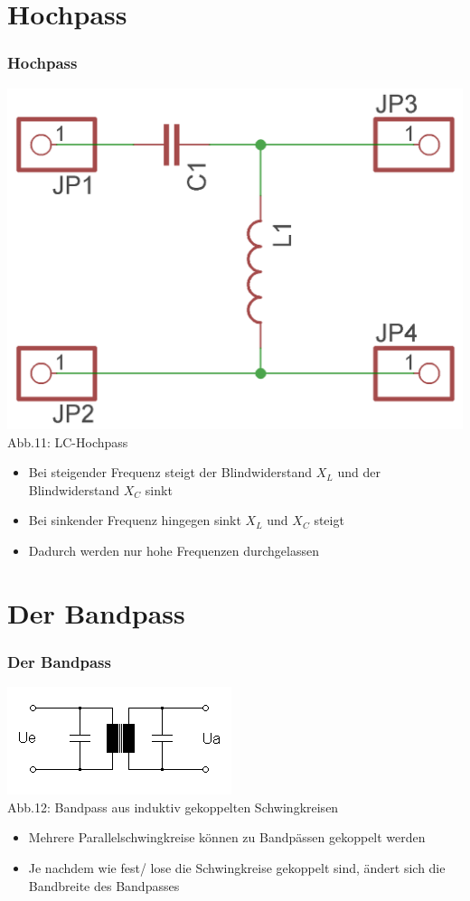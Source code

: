 \section*{Hochpass}
\begin{frame}
\frametitle{Hochpass}
\begin{center}
	\includegraphics[scale=1.2]{a04/LC-Hochpass.png}\\
	Abb.11: LC-Hochpass
\end{center}
\begin{itemize}
	\item Bei steigender Frequenz steigt der Blindwiderstand $X_L$ und der Blindwiderstand $X_C$ sinkt
	\item Bei sinkender Frequenz hingegen sinkt $X_L$ und $X_C$ steigt
	\item Dadurch werden nur hohe Frequenzen durchgelassen 
\end{itemize}
\end{frame}

\section*{Der Bandpass}
\begin{frame}
\frametitle{Der Bandpass}
\begin{center}
	\includegraphics[scale=0.5]{a04/BandpassSpulen.png}\\
	Abb.12: Bandpass aus induktiv gekoppelten Schwingkreisen \cite{wpde}
\end{center}
\begin{itemize}
	\item	Mehrere Parallelschwingkreise können zu Bandpässen gekoppelt werden
	\item	Je nachdem wie fest/ lose die Schwingkreise gekoppelt sind, ändert sich die Bandbreite des Bandpasses
\end{itemize}
\end{frame}

